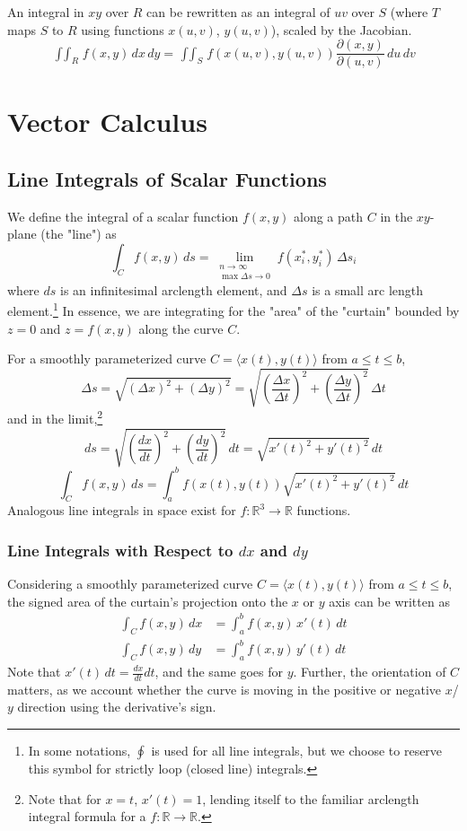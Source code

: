 \documentclass{article}
\begin{document}
An integral in $xy$ over $R$ can be rewritten as an integral of $uv$ over $S$ (where $T$ maps $S$ to $R$ using functions $x(u,v)$, $y(u,v)$), scaled by the Jacobian.
$$\mathop{\int\int}_Rf(x,y)\,dx\,dy=\mathop{\int\int}_Sf(x(u,v), y(u,v))\frac{\partial(x,y)}{\partial(u,v)}\,du\,dv$$

\section{Vector Calculus}
\subsection{Line Integrals of Scalar Functions}
We define the integral of a scalar function $f(x,y)$ along a path $C$ in the $xy$-plane (the "line") as
$$\int_C f(x,y)\,ds = \lim_{\substack{n\to\infty\\\max \Delta{s}\to0}}f(x_i^*,y_i^*)\,\Delta{s}_i$$
where $ds$ is an infinitesimal arclength element, and $\Delta{s}$ is a small arc length element.\footnote{In some notations, $\oint$ is used for all line integrals, but we choose to reserve this symbol for strictly loop (closed line) integrals.} In essence, we are integrating for the "area" of the "curtain" bounded by $z=0$ and $z=f(x,y)$ along the curve $C$.

For a smoothly parameterized curve $C=\langle x(t),y(t)\rangle$ from $a\le t \le b$,
\[
    \Delta{s}=\sqrt{(\Delta{x})^2+(\Delta y)^2} = \sqrt{\left(\frac{\Delta{x}}{\Delta t}\right)^2+\left(\frac{\Delta{y}}{\Delta t}\right)^2}\,\Delta t
\]
and in the limit,\footnote{Note that for $x=t$, $x'(t) = 1$, lending itself to the familiar arclength integral formula for a $f:\mathbb{R}\to\mathbb{R}$.} \[ds = \sqrt{\left(\frac{dx}{dt}\right)^2+\left(\frac{dy}{dt}\right)^2}\,dt = \sqrt{x'(t)^2 + y'(t)^2}\,dt\]
$$\int_Cf(x,y)\,ds=\int_a^bf(x(t),y(t))\sqrt{x'(t)^2 + y'(t)^2}\,dt$$
Analogous line integrals in space exist for $f: \mathbb{R}^3\to\mathbb{R}$ functions.

\subsubsection{Line Integrals with Respect to $dx$ and $dy$}
Considering a smoothly parameterized curve $C=\langle x(t),y(t)\rangle$ from $a\le t \le b$, the signed area of the curtain's projection onto the $x$ or $y$ axis can be written as
\begin{align*}
    \int_Cf(x,y)\,dx&=\int_a^bf(x,y)\,x'(t)\,dt\\
    \int_Cf(x,y)\,dy&=\int_a^bf(x,y)\,y'(t)\,dt
\end{align*}
Note that $x'(t)\,dt=\frac{dx}{dt}dt$, and the same goes for $y$. Further, the orientation of $C$ matters, as we account whether the curve is moving in the positive or negative $x$/$y$ direction using the derivative's sign.
\end{document}
